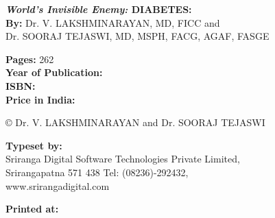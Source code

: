 \thispagestyle{empty}

\noindent\textbf{\textit{World's Invisible Enemy:} DIABETES:}\\
\textbf{By:} Dr. V. LAKSHMINARAYAN, {\small MD, FICC} and\\
Dr. SOORAJ TEJASWI, {\small MD, MSPH, FACG, AGAF, FASGE}
 
 \vfill
 
 \noindent
\textbf{Pages:} 262\\
\textbf{Year of Publication:} \\
 \textbf{ISBN:} \\
\textbf{ Price in India:} \rupee 


 \vfill
 
\noindent © Dr. V. LAKSHMINARAYAN and Dr. SOORAJ TEJASWI
 
  \vfill
  
\noindent
\textbf{Typeset by:}\\
Sriranga Digital Software Technologies Private Limited,\\
Srirangapatna 571 438 Tel: (08236)-292432,\\
www.srirangadigital.com\\

 \vfill

\noindent
\textbf{Printed at:}






